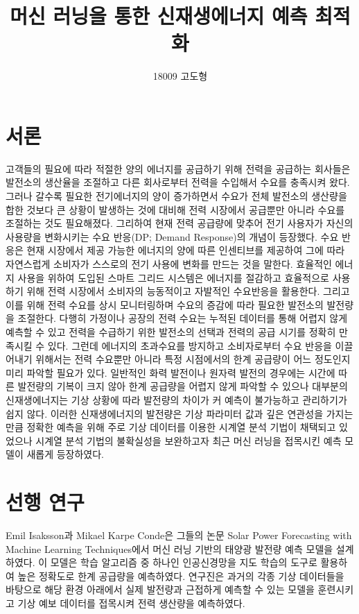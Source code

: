 \documentclass{article}
\begin{document}

\title{머신 러닝을 통한 신재생에너지 예측 최적화}
\author{18009 고도형}
\maketitle



\section{서론}
고객들의 필요에 따라 적절한 양의 에너지를 공급하기 위해 전력을 공급하는 회사들은 발전소의 생산율을 조절하고 다른 회사로부터 전력을 수입해서 수요를 충족시켜 왔다. 그러나 갈수록 필요한 전기에너지의 양이 증가하면서 수요가 전체 발전소의 생산량을 합한 것보다 큰 상황이 발생하는 것에 대비해 전력 시장에서 공급뿐만 아니라 수요를 조절하는 것도 필요해졌다. 그리하여 현재 전력 공급량에 맞추어 전기 사용자가 자신의 사용량을 변화시키는 수요 반응(DP; Demand Response)의 개념이 등장했다. 수요 반응은 현재 시장에서 제공 가능한 에너지의 양에 따른 인센티브를 제공하여 그에 따라 자연스럽게 소비자가 스스로의 전기 사용에 변화를 만드는 것을 말한다. 효율적인 에너지 사용을 위하여 도입된 스마트 그리드 시스템은 에너지를 절감하고 효율적으로 사용하기 위해 전력 시장에서 소비자의 능동적이고 자발적인 수요반응을 활용한다. 그리고 이를 위해 전력 수요를 상시 모니터링하며 수요의 증감에 따라 필요한 발전소의 발전량을 조절한다. 다행히 가정이나 공장의 전력 수요는 누적된 데이터를 통해 어렵지 않게 예측할 수 있고 전력을 수급하기 위한 발전소의 선택과 전력의 공급 시기를 정확히 만족시킬 수 있다. \newline
그런데 에너지의 초과수요를 방지하고 소비자로부터 수요 반응을 이끌어내기 위해서는 전력 수요뿐만 아니라 특정 시점에서의 한계 공급량이 어느 정도인지 미리 파악할 필요가 있다. 일반적인 화력 발전이나 원자력 발전의 경우에는 시간에 따른 발전량의 기복이 크지 않아 한계 공급량을 어렵지 않게 파악할 수 있으나 대부분의 신재생에너지는 기상 상황에 따라 발전량의 차이가 커 예측이 불가능하고 관리하기가 쉽지 않다. 이러한 신재생에너지의 발전량은 기상 파라미터 값과 깊은 연관성을 가지는 만큼 정확한 예측을 위해 주로 기상 데이터를 이용한 시계열 분석 기법이 채택되고 있었으나 시계열 분석 기법의 불확실성을 보완하고자 최근 머신 러닝을 접목시킨 예측 모델이 새롭게 등장하였다.



\section{선행 연구}
Emil Isaksson과 Mikael Karpe Conde은 그들의 논문 Solar Power Forecasting with Machine Learning Techniques에서 머신 러닝 기반의 태양광 발전량 예측 모델을 설계하였다. 이 모델은 학습 알고리즘 중 하나인 인공신경망을 지도 학습의 도구로 활용하여 높은 정확도로 한계 공급량을 예측하였다. 연구진은 과거의 각종 기상 데이터들을 바탕으로 해당 환경 아래에서 실제 발전량과 근접하게 예측할 수 있는 모델을 훈련시키고 기상 예보 데이터를 접목시켜 전력 생산량을 예측하였다.
\end{document}
